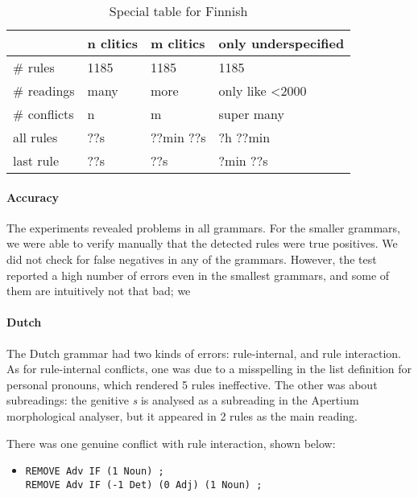 \begin{table}[]
\centering
\begin{tabular}{|l|l|l|l|}

\hline
              & n clitics & m clitics & only underspecified \\ \hline
\# rules      & 1185      & 1185      & 1185\\ \hline
\# readings   & many & more & only like <2000   \\ \hline
\# conflicts  & n   & m        & super many    \\ \hline
\clock{} all rules       & ??s              & ??min ??s    & ?h ??min    \\ \hline
\clock{} last rule       & ??s              & ??s          & ?min ??s    \\ \hline


\end{tabular}
\caption{Special table for Finnish}
\label{table:resFin}
\end{table}

\paragraph{Accuracy} 
The experiments revealed problems in all grammars. For the smaller
grammars, we were able to verify manually that the detected rules were
true positives.
We did not check for false negatives in any of the grammars. However, the test reported a high number of errors even in the smallest grammars, and some of them are intuitively not that bad; we 


\paragraph{Dutch} The Dutch grammar had two kinds of errors: rule-internal, and rule interaction. As for rule-internal conflicts, one was due to a misspelling in the list definition for personal pronouns, which rendered 5 rules ineffective. The other was about subreadings: the genitive \emph{s} is analysed as a subreading in the Apertium morphological analyser, but it appeared in 2 rules as the main reading. 

There was one genuine conflict with rule interaction, shown below:

\begin{itemize}
\item[] 
\begin{verbatim}REMOVE Adv IF (1 Noun) ;
REMOVE Adv IF (-1 Det) (0 Adj) (1 Noun) ;
\end{verbatim}
\end{itemize}

